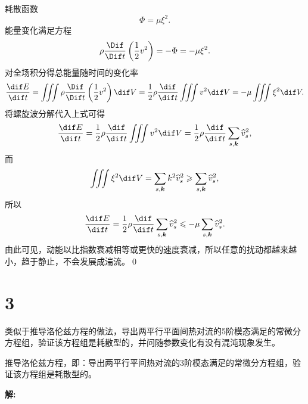 \documentclass[12pt]{ctexart}
\begin{document}
耗散函数
\begin{equation}
	\Phi = \mu \xi^2.
\end{equation}
能量变化满足方程
\begin{equation}
	\rho \frac{\Dif}{\Dif t}\left(\frac{1}{2}v^2\right) = - \Phi = - \mu \xi^2.
\end{equation}
对全场积分得总能量随时间的变化率
\begin{equation}
	\frac{\dif E}{\dif t} = \iiint \rho \frac{\Dif}{\Dif t}\left(\frac{1}{2}v^2\right) \dif V =  \frac{1}{2} \rho \frac{\dif }{\dif t} \iiint v^2 \dif V = - \mu  \iiint \xi^2 \dif V.
\end{equation}
将螺旋波分解代入上式可得
\begin{equation}
	\frac{\dif E}{\dif t} = \frac{1}{2} \rho \frac{\dif }{\dif t} \iiint v^2 \dif V =  \frac{1}{2} \rho \frac{\dif }{\dif t} \sum_{s,\bm{k}} \widehat{v}_{s}^2,
\end{equation}
而
\begin{equation}
	\iiint \xi^2 \dif V = \sum_{s, \boldsymbol{k}} k^2 \widehat{v}_{s}^2 \geqslant \sum_{s, \boldsymbol{k}} \widehat{v}_{s}^2,
\end{equation}
所以
\begin{equation}
	\frac{\dif E}{\dif t} = \frac{1}{2} \rho \frac{\dif }{\dif t} \sum_{s,\bm{k}} \widehat{v}_{s}^2 \leqslant - \mu \sum_{s, \boldsymbol{k}}  \widehat{v}_{s}^2.
\end{equation}
由此可见，动能以比指数衰减相等或更快的速度衰减，所以任意的扰动都越来越小，趋于静止，不会发展成湍流。\qed


\section{3}

类似于推导洛伦兹方程的做法，导出两平行平面间热对流的5阶模态满足的常微分方程组，验证该方程组是耗散型的，并问随参数变化有没有混沌现象发生。

推导洛伦兹方程，即：导出两平行平间热对流的3阶模态满足的常微分方程组，验证该方程组是耗散型的。

\textsf{\hspace{-2em}\sf  \textbf{解:}}
\end{document}
